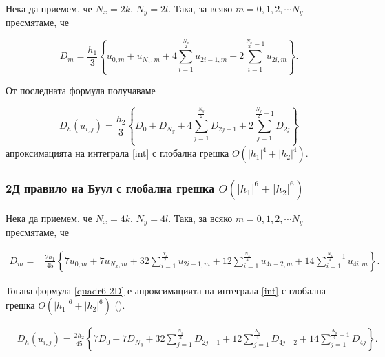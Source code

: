 \documentclass[a4paper]{article}
\theoremstyle{remark}
\begin{document}
\begin{large}
Нека да приемем, че $N_x=2k$, $N_y=2 l$. Така, за всяко $m=0,1,2,\cdots N_y$ пресмятаме, че

$$D_m= \frac{h_1 }{3} 
\left\{ u_{0,m}+u_{N_x,m}+ 4 \sum_{i=1}^{\frac{N_x}{2}}   u_{2i-1,m}
 +2 \sum_{i=1}^{\frac{N_x}{2}-1} u_{2i,m} \right\}.$$


От последната формула получаваме

\begin{equation}\label{quadr4}
D_h(u_{i,j}) =\frac{h_2 }{3} 
\left\{ D_{0}+D_{N_y}+ 4 \sum_{j=1}^{\frac{N_y}{2}}   D_{2j-1}
 +2 \sum_{j=1}^{{\frac{N_y}{2}}-1} D_{2j} \right\}
\end{equation}
апроксимацията на интеграла \eqref{int} с глобална грешка $O(|h_1|^4+|h_2|^4)$.


\subsubsection{ 2Д правило на Буул с глобална грешка $O(|h_1|^6+|h_2|^6)$}

Нека да приемем, че $N_x=4k$, $N_y=4 l$. Така, за всяко $m=0,1,2,\cdots N_y$ пресмятаме, че

\begin{align*}
D_m =& \frac{2h_1}{45} 
\left\{
7u_{0,m}+7u_{N_x,m}+32 \sum_{i=1}^{\frac{N_x}{2}}u_{2i-1,m}
+12\sum_{i=1}^{\frac{N_x}{4}}u_{4i-2,m}
+14 \sum_{i=1}^{\frac{N_x}{4}-1}u_{4i,m}
\right\}.
\end{align*}

Тогава формула \eqref{quadr6-2D} е апроксимацията на интеграла \eqref{int} с глобална грешка $O(|h_1|^6+|h_2|^6)$ (\cite{boole}).

\begin{align}\label{quadr6-2D}
&D_h(u_{i,j})  =
\frac{2h_2}{45} 
\left\{
7D_{0}+7D_{N_y}+32 \sum_{j=1}^{\frac{N_y}{2}}D_{2j-1}
+12\sum_{j=1}^{\frac{N_y}{4}}D_{4j-2}
+14 \sum_{j=1}^{\frac{N_y}{4}-1}D_{4j}
\right\}.
\end{align}


\end{large}
\end{document}

